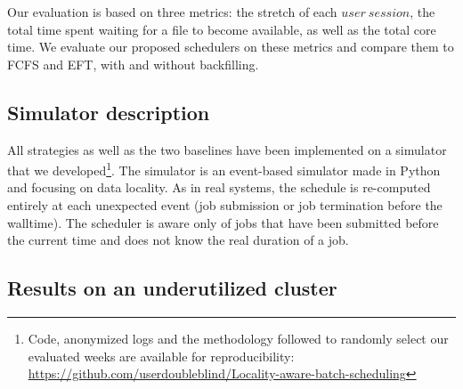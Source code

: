 \documentclass[conference]{IEEEtran}
\newcommand{\us}{\ensuremath{\mathit{user~session}}\xspace}
\begin{document}
Our evaluation is based on three metrics: the stretch of each \us, the total time spent waiting for a file to become available, as well as the total core time.
We evaluate our proposed schedulers on these metrics and compare them to FCFS and EFT, with and without backfilling.

\subsection{Simulator description}
All strategies as well as the two baselines have been implemented
on a simulator that we developed\footnote{Code, anonymized logs and the methodology followed to randomly select our evaluated weeks are available for reproducibility: \url{https://github.com/userdoubleblind/Locality-aware-batch-scheduling}}.
The simulator is an event-based simulator made in Python and focusing on data locality.
As in real systems, the schedule is re-computed entirely at each unexpected event (job submission or job termination before the walltime).
The scheduler is aware only of jobs that have been submitted before the current time and does not know the real duration of a job.

\subsection{Results on an underutilized cluster}\label{sec.40}
\end{document}
